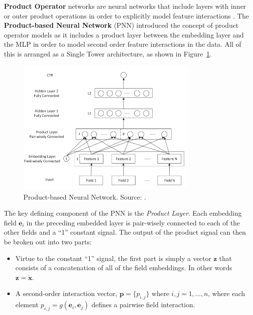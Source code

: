 \documentclass{mldsmsc}
\begin{document}
\textbf{Product Operator} networks are neural networks that include layers with inner or outer
product operations in order to explicitly model feature interactions \citep{RefWorks:zhang2021deep}.
The \textbf{Product-based Neural Network} (PNN) introduced the concept of product operator models
as it includes a product layer between the embedding layer and the MLP in order to model second
order feature interactions in the data. All of this is arranged as a Single Tower architecture, as shown
in Figure~\ref{fig:pnn}.

\begin{figure}[h]
    \centering
    \includegraphics[width=0.8\textwidth]{../figures/pnn.png}
    \caption{Product-based Neural Network. Source: \citep{RefWorks:qu2016product-based}.}
    \label{fig:pnn}
\end{figure}

The key defining component of the PNN is the \emph{Product Layer}. Each embedding field $\mathbf{e}_i$
in the preceding embedded layer is pair-wisely connected to each of the other fields and a ``1''
constant signal. The output of the product signal can then be broken out into two parts:

\begin{itemize}
    \item Virtue to the constant ``1'' signal, the first part is simply a vector $\mathbf{z}$ that consists of a concatenation
    of all of the field embeddings. In other words $\mathbf{z} = \dot{\mathbf{x}}$.
    \item A second-order interaction vector, $\mathbf{p} = \{p_{i,j}\}\text{ where } i,j = 1, \ldots, n$, where each element
    $p_{i,j} = g(\mathbf{e}_i, \mathbf{e}_j)$ defines a pairwise field interaction.
\end{itemize}
\end{document}
